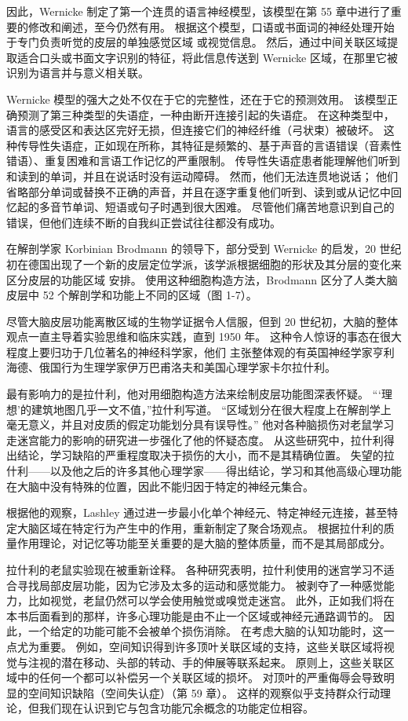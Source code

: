 因此，Wernicke 制定了第一个连贯的语言神经模型，该模型在第 55 章中进行了重要的修改和阐述，至今仍然有用。
根据这个模型，口语或书面词的神经处理开始于专门负责听觉的皮层的单独感觉区域 或视觉信息。 
然后，通过中间关联区域提取适合口头或书面文字识别的特征，将此信息传送到 Wernicke 区域，在那里它被识别为语言并与意义相关联。


Wernicke 模型的强大之处不仅在于它的完整性，还在于它的预测效用。 
该模型正确预测了第三种类型的失语症，一种由断开连接引起的失语症。 
在这种类型中，语言的感受区和表达区完好无损，但连接它们的神经纤维（弓状束）被破坏。 
这种传导性失语症，正如现在所称，其特征是频繁的、基于声音的言语错误（音素性错语）、重复困难和言语工作记忆的严重限制。 
传导性失语症患者能理解他们听到和读到的单词，并且在说话时没有运动障碍。 
然而，他们无法连贯地说话； 他们省略部分单词或替换不正确的声音，并且在逐字重复他们听到、读到或从记忆中回忆起的多音节单词、短语或句子时遇到很大困难。 
尽管他们痛苦地意识到自己的错误，但他们连续不断的自我纠正尝试往往都没有成功。


在解剖学家 Korbinian Brodmann 的领导下，部分受到 Wernicke 的启发，20 世纪初在德国出现了一个新的皮层定位学派，该学派根据细胞的形状及其分层的变化来区分皮层的功能区域 安排。 
使用这种细胞构造方法，Brodmann 区分了人类大脑皮层中 52 个解剖学和功能上不同的区域（图 1-7）。


尽管大脑皮层功能离散区域的生物学证据令人信服，但到 20 世纪初，大脑的整体观点一直主导着实验思维和临床实践，直到 1950 年。
这种令人惊讶的事态在很大程度上要归功于几位著名的神经科学家，他们 主张整体观的有英国神经学家亨利海德、俄国行为生理学家伊万巴甫洛夫和美国心理学家卡尔拉什利。


最有影响力的是拉什利，他对用细胞构造方法来绘制皮层功能图深表怀疑。 
“‘理想’的建筑地图几乎一文不值，”拉什利写道。 “区域划分在很大程度上在解剖学上毫无意义，并且对皮质的假定功能划分具有误导性。” 
他对各种脑损伤对老鼠学习走迷宫能力的影响的研究进一步强化了他的怀疑态度。 
从这些研究中，拉什利得出结论，学习缺陷的严重程度取决于损伤的大小，而不是其精确位置。 
失望的拉什利——以及他之后的许多其他心理学家——得出结论，学习和其他高级心理功能在大脑中没有特殊的位置，因此不能归因于特定的神经元集合。


根据他的观察，Lashley 通过进一步最小化单个神经元、特定神经元连接，甚至特定大脑区域在特定行为产生中的作用，重新制定了聚合场观点。 
根据拉什利的质量作用理论，对记忆等功能至关重要的是大脑的整体质量，而不是其局部成分。


拉什利的老鼠实验现在被重新诠释。 
各种研究表明，拉什利使用的迷宫学习不适合寻找局部皮层功能，因为它涉及太多的运动和感觉能力。 
被剥夺了一种感觉能力，比如视觉，老鼠仍然可以学会使用触觉或嗅觉走迷宫。 
此外，正如我们将在本书后面看到的那样，许多心理功能是由不止一个区域或神经元通路调节的。 
因此，一个给定的功能可能不会被单个损伤消除。 在考虑大脑的认知功能时，这一点尤为重要。 
例如，空间知识得到许多顶叶关联区域的支持，这些关联区域将视觉与注视的潜在移动、头部的转动、手的伸展等联系起来。 
原则上，这些关联区域中的任何一个都可以补偿另一个关联区域的损坏。 
对顶叶的严重侮辱会导致明显的空间知识缺陷（空间失认症）（第 59 章）。 
这样的观察似乎支持群众行动理论，但我们现在认识到它与包含功能冗余概念的功能定位相容。


